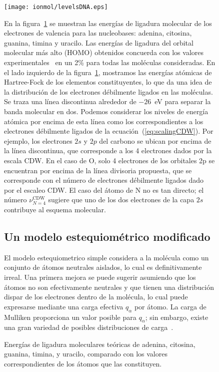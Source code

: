 \begin{figure}
\begin{figure*}[t]
\centering
\texttt{[image: ionmol/levelsDNA.eps]}
\caption[Energías de ligadura moleculares teóricas de ADN y ARN.]
{Energías de ligadura moleculares teóricas de adenina, citosina, guanina, 
timina, y uracilo, comparado con los valores correspondientes de los 
átomos que las constituyen.}
\label{fig:bindener}
\end{figure*}

En la figura~\ref{fig:bindener} se muestran las energías de ligadura 
molecular de los electrones de valencia para las nucleobases: adenina, 
citosina, guanina, timina y uracilo. Las energías de ligadura del orbital 
molecular más alto (HOMO) obtenidos concuerda con los valores
experimentales~\cite{Hush,Verkin,Dougherty} en un 2\% para todas las 
moléculas consideradas. En el lado izquierdo de la figura~\ref{fig:bindener}, 
mostramos las energías atómicas de Hartree-Fock de los elementos 
constituyentes, lo que da una idea de la distribución de los electrones
débilmente ligados en las moléculas. Se traza una línea discontinua 
alrededor de $-26$~eV para separar la banda molecular en dos. Podemos 
considerar los niveles de energía atómica por encima de esta línea como 
los correspondientes a los electrones débilmente ligados de la 
ecuación~(\ref{eq:scalingCDW}). Por ejemplo, los electrones $2s$ y $2p$ 
del carbono se ubican por encima de la línea discontinua, que corresponde 
a los 4 electrones dados por la escala CDW. En el caso de O, solo 4 
electrones de los orbitales 2p se encuentran por encima de la línea 
divisoria propuesta, que se corresponde con el número de electrones
débilmente ligados dado por el escaleo CDW. El caso del átomo de N no 
es tan directo; el número $\nu_{N=4}^{\text{CDW}}$ sugiere que uno de 
los dos electrones de la capa $2s$ contribuye al esquema molecular.

\subsection{Un modelo estequiométrico modificado}

El modelo estequiometrico simple considera a la molécula como un 
conjunto de átomos neutrales aislados, lo cual es definitivamente irreal.
Una primera mejora se puede sugerir asumiendo que los átomos no son
efectivamente neutrales y que tienen una distribución dispar de los 
electrones dentro de la molécula, lo cual puede expresarse mediante una
carga efectiva $q_{\alpha}$ por átomo. La carga de Mulliken proporciona
un valor posible para $q_{\alpha}$; sin embargo, existe una gran variedad
de posibles distribuciones de carga~\cite{lee2003}.


\end{figure}
